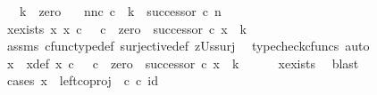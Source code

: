 \begin{isabellebody}
\ \ \ {\isachardoublequoteopen}k\ {\isasymnoteq}\ zero{\isachardoublequoteclose}\isanewline
\ \ \ {\isachardoublequoteopen}{\isasymexists}n{\isachardot}{\kern0pt}{\isacharparenleft}{\kern0pt}n{\isasymin}\isactrlsub c\ {\isasymnat}\isactrlsub c\ {\isasymand}\ k\ {\isacharequal}{\kern0pt}\ successor\ {\isasymcirc}\isactrlsub c\ n{\isacharparenright}{\kern0pt}{\isachardoublequoteclose}\isanewline
%
\isadelimproof
%
\endisadelimproof
%
\isatagproof
{}\isamarkupfalse%
\ {\isacharminus}{\kern0pt}\ \isanewline
\ \ \isamarkupfalse%
\ x{\isacharunderscore}{\kern0pt}exists{\isacharcolon}{\kern0pt}\ {\isachardoublequoteopen}{\isasymexists}x{\isachardot}{\kern0pt}\ {\isacharparenleft}{\kern0pt}{\isacharparenleft}{\kern0pt}x\ {\isasymin}\isactrlsub c\ {\isasymone}\ {\isasymCoprod}\ {\isasymnat}\isactrlsub c{\isacharparenright}{\kern0pt}\ {\isasymand}\ {\isacharparenleft}{\kern0pt}zero\ {\isasymamalg}\ successor\ {\isasymcirc}\isactrlsub c\ x\ {\isacharequal}{\kern0pt}\ k{\isacharparenright}{\kern0pt}{\isacharparenright}{\kern0pt}{\isachardoublequoteclose}\isanewline
\ \ \ \ \isamarkupfalse%
\ assms\ cfunc{\isacharunderscore}{\kern0pt}type{\isacharunderscore}{\kern0pt}def\ surjective{\isacharunderscore}{\kern0pt}def\ zUs{\isacharunderscore}{\kern0pt}surj\ \isamarkupfalse%
\ {\isacharparenleft}{\kern0pt}typecheck{\isacharunderscore}{\kern0pt}cfuncs{\isacharcomma}{\kern0pt}\ auto{\isacharparenright}{\kern0pt}\isanewline
\ \ \isamarkupfalse%
\ x\ \ x{\isacharunderscore}{\kern0pt}def{\isacharcolon}{\kern0pt}\ {\isachardoublequoteopen}{\isacharparenleft}{\kern0pt}{\isacharparenleft}{\kern0pt}x\ {\isasymin}\isactrlsub c\ {\isasymone}\ {\isasymCoprod}\ {\isasymnat}\isactrlsub c{\isacharparenright}{\kern0pt}\ {\isasymand}\ {\isacharparenleft}{\kern0pt}zero\ {\isasymamalg}\ successor\ {\isasymcirc}\isactrlsub c\ x\ {\isacharequal}{\kern0pt}\ k{\isacharparenright}{\kern0pt}{\isacharparenright}{\kern0pt}{\isachardoublequoteclose}\isanewline
\ \ \ \ \isamarkupfalse%
\ x{\isacharunderscore}{\kern0pt}exists\ \isamarkupfalse%
\ blast\isanewline
\ \ \isamarkupfalse%
\ cases{\isacharcolon}{\kern0pt}\ {\isachardoublequoteopen}{\isacharparenleft}{\kern0pt}x\ {\isacharequal}{\kern0pt}\ {\isacharparenleft}{\kern0pt}left{\isacharunderscore}{\kern0pt}coproj\ {\isasymone}\ {\isasymnat}\isactrlsub c{\isacharparenright}{\kern0pt}\ {\isasymcirc}\isactrlsub c\ id\ {\isasymone}{\isacharparenright}{\kern0pt}\ {\isasymor}\ \isanewline

\end{isabellebody}
